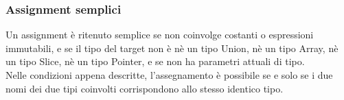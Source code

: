 \subsubsection{Assignment semplici}
Un assignment è ritenuto semplice se non coinvolge costanti o espressioni immutabili, e se
il tipo del target non è nè un tipo Union, nè un tipo Array, nè un tipo Slice, nè un tipo Pointer, 
e se non ha parametri attuali di tipo. \\

Nelle condizioni appena descritte, l'assegnamento è possibile se e solo se i due nomi 
dei due tipi coinvolti corrispondono allo stesso identico tipo. \\